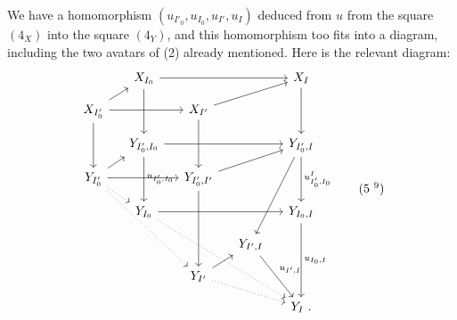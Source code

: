 \documentclass[11pt]{article}
\newcommand{\printedpage}[1]{\marginpar{\footnotesize p.~#1}}
\newcommand{\msp}[1]{\marginpar{\footnotesize [#1]}}
\begin{document}
\msp{page 16}
We have a homomorphism $(u_{I'_0}, u_{I_0}, u_{I'}, u_I)$ deduced from $u$ from the square $(4_X)$ into the square $(4_Y)$, %
and this homomorphism too fits into a diagram, including the two avatars of (2) already mentioned. Here is the relevant diagram: %
\printedpage{10}
\[
\begin{tikzcd}[column sep=small, row sep=small]
 & X_{I_0} \arrow[rrr] \arrow[dd] & & & X_I \arrow[dd] \\
X_{I'_0} \arrow[ur] \arrow[rr] \arrow[dd] & & X_{I'} \arrow[urr] \arrow[dd] & & \\
 & Y_{I'_0,I_0} \arrow[rrr] \arrow[dd, "u_{I'_0,I_0}"] & & & Y_{I'_0,I} \arrow[dd, "u^I_{I'_0,I_0}"] \arrow[dddl] \\
Y_{I'_0} \arrow[ur] \arrow[rr] \arrow[dr, dotted] \arrow[dddrr, dotted] & & Y_{I'_0,I'} \arrow[urr] \arrow[ddd] & & \\
 & Y_{I_0} \arrow[rrr] \arrow[dddrrr, dotted] & & & Y_{I_0,I} \arrow[ddd, "u_{I_0,I}"] \\
 & & & Y_{I',I} \arrow[ddr, "u_{I',I}"] & \\
 & & Y_{I'} \arrow[ur] \arrow[drr, dotted] & & \\
 & & & & Y_I\ .
\end{tikzcd}
\tag*{(5~\footnotemark[9])}
\]
\end{document}
